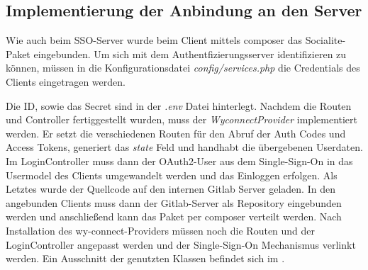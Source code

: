 \subsection{Implementierung der Anbindung an den Server}
\label{sec:ImplementierungCient}

Wie auch beim \ac{SSO}-Server wurde beim Client mittels composer das Socialite-Paket eingebunden. Um sich mit dem Authentfizierungsserver identifizieren zu können, müssen in die Konfigurationsdatei \textit{config/services.php} die Credentials des Clients eingetragen werden. 

Die ID, sowie das Secret sind in der \textit{.env} Datei hinterlegt. Nachdem die Routen und Controller fertiggestellt wurden, muss der \textit{WyconnectProvider} implementiert werden. Er setzt die verschiedenen Routen für den Abruf der Auth Codes und Access Tokens, generiert das \textit{state} Feld und handhabt die übergebenen Userdaten. 
Im LoginController muss dann  der OAuth2-User aus dem Single-Sign-On in das Usermodel des Clients umgewandelt werden und das Einloggen erfolgen. 
Als Letztes wurde der Quellcode auf den internen Gitlab Server geladen. In den angebunden Clients muss dann der Gitlab-Server als Repository eingebunden werden und anschließend kann das Paket per composer verteilt werden. 
Nach Installation des wy-connect-Providers müssen noch die Routen und der LoginController angepasst werden und der Single-Sign-On Mechanismus verlinkt werden. Ein Ausschnitt der genutzten Klassen befindet sich im .

